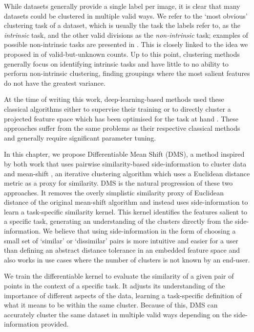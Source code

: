 \documentclass[../thesis.tex]{subfiles}
\begin{document}
While datasets generally provide a single label per image, it is clear that many datasets could be clustered in multiple valid ways.
We refer to the `most obvious' clustering task of a dataset, which is usually the task the labels refer to, as the \textit{intrinsic} task, and the other valid divisions as the \textit{non-intrinsic} task; examples of possible non-intrinsic tasks are presented in . This is closely linked to the idea we proposed in  of valid-but-unknown counts.
Up to this point, clustering methods generally focus on identifying intrinsic tasks and have little to no ability to perform non-intrinsic clustering, \ie finding groupings where the most salient features do not have the greatest variance.

At the time of writing this work, deep-learning-based methods used these classical algorithms either to supervise their training \cite{Shah2018,shah2018deep} or to directly cluster a projected feature space which has been optimised for the task at hand \cite{Chang2017, Yang2017}. These approaches suffer from the same problems as their respective classical methods and generally require significant parameter tuning.

In this chapter, we propose Differentiable Mean Shift (DMS), a method inspired by both work that uses pairwise similarity-based side-information to cluster data \cite{xing2002distance,han2020automatically, Han} and mean-shift \cite{Fukunaga1975}, an iterative clustering algorithm which uses a Euclidean distance metric as a proxy for similarity.
DMS is the natural progression of these two approaches.
It removes the overly simplistic similarity proxy of Euclidean distance of the original mean-shift algorithm and instead uses side-information to learn a task-specific similarity kernel.
This kernel identifies the features salient to a specific task, generating an understanding of the clusters directly from the side-information. 
We believe that using side-information in the form of choosing a small set of `similar' or `dissimilar' pairs is more intuitive and easier for a user than defining an abstract distance tolerance in an embedded feature space and also works in use cases where the number of clusters is not known by an end-user.

We train the differentiable kernel to evaluate the similarity of a given pair of points in the context of a specific task.
It adjusts its understanding of the importance of different aspects of the data, learning a task-specific definition of what it means to be within the same cluster. 
Because of this, DMS can accurately cluster the same dataset in multiple valid ways depending on the side-information provided.
\end{document}
